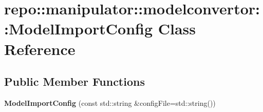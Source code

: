 \hypertarget{classrepo_1_1manipulator_1_1modelconvertor_1_1_model_import_config}{}\section{repo\+:\+:manipulator\+:\+:modelconvertor\+:\+:Model\+Import\+Config Class Reference}
\label{classrepo_1_1manipulator_1_1modelconvertor_1_1_model_import_config}
\subsection*{Public Member Functions}
\begin{DoxyCompactItemize}
\item 
\hypertarget{classrepo_1_1manipulator_1_1modelconvertor_1_1_model_import_config_a8fddc7e979da71e7feb86363aca76b8e}{}{\bfseries Model\+Import\+Config} (const std\+::string \&config\+File=std\+::string())\label{classrepo_1_1manipulator_1_1modelconvertor_1_1_model_import_config_a8fddc7e979da71e7feb86363aca76b8e}


\end{DoxyCompactItemize}
